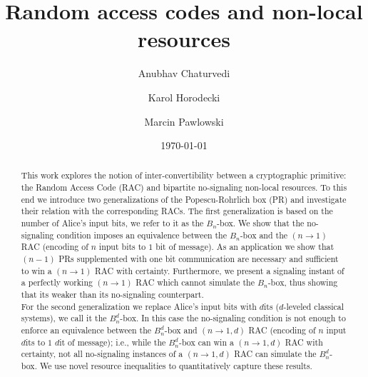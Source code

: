 \documentclass[%
 reprint,
 amsmath,amssymb,
 aps,
]{revtex4-1}
\begin{document}

\title{Random access codes and non-local resources }%

\author{Anubhav Chaturvedi}
\author{Karol Horodecki}
\author{Marcin Pawlowski}

\date{\today}%

\begin{abstract}
This work explores the notion of inter-convertibility between a cryptographic primitive: the Random Access Code (RAC) and bipartite no-signaling non-local resources. To this end we introduce two generalizations of the Popescu-Rohrlich box (PR) and investigate their relation with the corresponding RACs. The first generalization is based on the number of Alice's input bits, we refer to it as the $B_n$-box. We show that the no-signaling condition imposes an equivalence between the $B_n$-box and the $(n \rightarrow 1)$ RAC (encoding of $n$ input bits to $1$ bit of message). As an application we show that $(n-1)$ PRs supplemented with one bit communication are necessary and sufficient to win a $(n\rightarrow 1)$ RAC with certainty. Furthermore, we present a signaling instant of a perfectly working $(n\rightarrow 1)$ RAC which cannot simulate the $B_n$-box, thus showing that its weaker than its no-signaling counterpart. \\ 
For the second generalization we replace Alice's input bits with $d$its ($d$-leveled classical systems), we call it the $B_n^d$-box. In this case the no-signaling condition is not enough to enforce an equivalence between the $B_n^d$-box and $(n\rightarrow 1,d)$ RAC (encoding of $n$ input $d$its to $1$ $d$it of message); i.e., while the $B_n^d$-box can win a $(n\rightarrow 1,d)$ RAC with certainty, not all no-signaling instances of a $(n\rightarrow 1,d)$ RAC can simulate the $B_n^d$-box. We use novel resource inequalities to quantitatively capture these results. 

\end{abstract}
\end{document}
